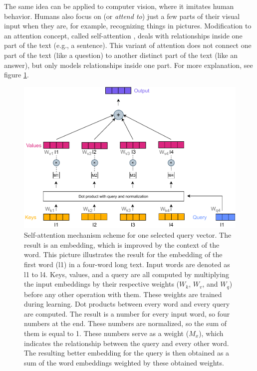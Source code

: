 The same idea can be applied to computer vision, where it imitates human behavior. Humans also focus on (or \textit{attend to}) just a few parts of their visual input when they are, for example, recognizing things in pictures.
Modification to an attention concept, called self-attention \citep{Cheng}, deals with relationships inside one part of the text (e.g., a sentence). This variant of attention does not connect one part of the text (like a question) to another distinct part of the text (like an answer), but only models relationships inside one part. For more explanation, see figure \ref{pic:att_self}.
\begin{figure}[H]
\centering
\includegraphics[width=1\columnwidth]{../img/self_attention1.pdf}
\caption[Self-attention mechanism]{Self-attention mechanism scheme for one selected query vector. The result is an embedding, which is improved by the context of the word. This picture illustrates the result for the embedding %
of the first word (l1) in a four-word long text. Input words are denoted as l1 to l4. Keys, values, and a query are all computed by multiplying the input embeddings by their respective weights ($W_k$, $W_v$, and $W_q$) before any other operation with them. These weights are trained during learning. Dot products between every word and every query are computed. The result is a number for every input word, so four numbers at the end. These numbers are normalized, so the sum of them is equal to 1. These numbers serve as a weight ($M_x$), which indicates the relationship between the query and every other word. The resulting better embedding for the query is then obtained as a sum of the word embeddings weighted by these obtained weights. %
}
\label{pic:att_self}
\end{figure}

